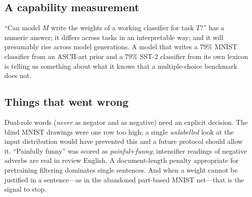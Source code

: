 \subsection{A capability measurement}
``Can model $M$ write the weights of a working classifier for task $T$?'' has a numeric
answer; it differs across tasks in an interpretable way; and it will presumably rise
across model generations. A model that writes a 79\% MNIST classifier from an
ASCII-art prior and a 79\% SST-2 classifier from its own lexicon is telling us something
about what it knows that a multiple-choice benchmark does not.

\subsection{Things that went wrong}
Dual-role words (\emph{never} as negator and as negative) need an explicit decision.
The blind MNIST drawings were one row too high; a single \emph{unlabelled} look at the
input distribution would have prevented this and a future protocol should allow it.
``Painfully funny'' was scored as \emph{painful}+\emph{funny}; intensifier readings of
negative adverbs are real in review English. A document-length penalty appropriate for
pretraining filtering dominates single sentences. And when a weight cannot be
justified in a sentence---as in the abandoned part-based MNIST net---that is the signal
to stop.
